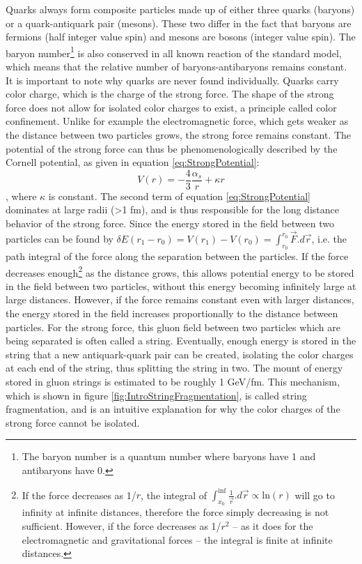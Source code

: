 Quarks always form composite particles made up of either three quarks (baryons) or a quark-antiquark pair (mesons). %
These two differ in the fact that baryons are fermions (half integer value spin) and mesons are bosons (integer value spin). The baryon number\footnote{The baryon number is a quantum number where baryons have 1 and antibaryons have 0.} is also conserved in all known reaction of the standard model, which means that the relative number of baryons-antibaryons remains constant. \\
It is important to note why quarks are never found individually. Quarks carry color charge, which is the charge of the strong force. The shape of the strong force does not allow for isolated color charges to exist, a principle called  color confinement. Unlike for example the electromagnetic force, which gets weaker as the distance between two particles grows, the strong force remains constant. The potential of the strong force can thus be phenomenologically described by the Cornell potential\cite{Strong_potential}, as given in equation \ref{eq:StrongPotential}:
\begin{equation}\label{eq:StrongPotential}
    V(r) = -\frac{4}{3}\frac{\alpha_s}{r}+\kappa r
\end{equation}
, where $\kappa$ is constant. The second term of equation \ref{eq:StrongPotential} dominates at large radii (>1 fm), and is thus responsible for the long distance behavior of the strong force. Since the energy stored in the field between two particles can be found by $\delta E(r_1-r_0) = V(r_1)-V(r_0) = \int_{r_0}^{r_0} \vec{F}.d\vec{r}$, i.e. the path integral of the force along the separation between the particles. If the force decreases enough\footnote{If the force decreases as 1/$r$, the integral of $\int_{x_0}^{\inf} \frac{1}{\vec{r} } .d\vec{r} \propto \mathrm{ln}(r)$ will go to infinity at infinite distances, therefore the force simply decreasing is not sufficient. However, if the force decreases as 1/$r^2$ -- as it does for the electromagnetic and gravitational forces -- the integral is finite at infinite distances.} as the distance grows, this allows potential energy to be stored in the field between two particles, without this energy becoming infinitely large at large distances. However, if the force remains constant even with larger distances, the energy stored in the field increases proportionally to the distance between particles. For the strong force, this gluon field between two particles which are being separated is often called a string. Eventually, enough energy is stored in the string that a new antiquark-quark pair can be created, isolating the color charges at each end of the string, thus splitting the string in two. The mount of energy stored in gluon strings is estimated to be roughly 1 GeV/fm\cite{}. This mechanism, which is shown in figure \ref{fig:IntroStringFragmentation}, is called string fragmentation, and is an intuitive explanation for why the color charges of the strong force cannot be isolated. \\

